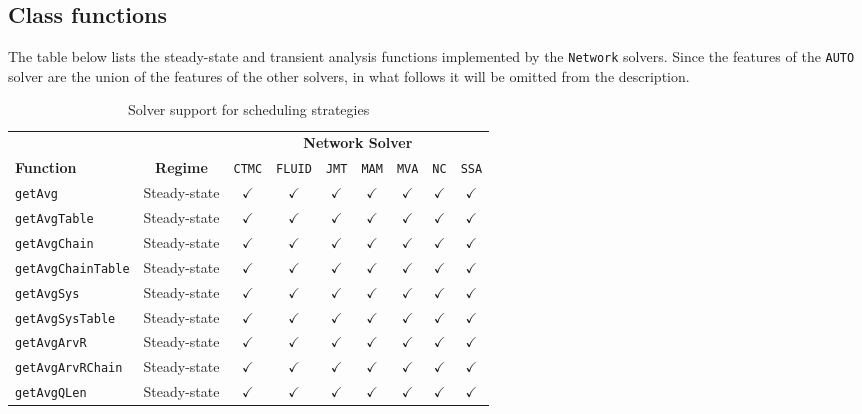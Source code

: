 \subsection{Class functions}
The table below lists the steady-state and transient analysis functions implemented by the \texttt{Network} solvers. Since the features of the \texttt{AUTO} solver are the union of the features of the other solvers, in what follows it will be omitted from the description.
{\scriptsize
\begin{table}[thbp]
\renewcommand{\arraystretch}{1.2}
\centering
\caption{Solver support for scheduling strategies}
\begin{tabular}{|l|c|c|c|c|c|c|c|c|}
\cline{3-9}
\multicolumn{1}{l}{}& &\multicolumn{7}{c|}{\textbf{Network Solver}}\\
\cline{1-9}
\textbf{Function}& \textbf{Regime}&\texttt{CTMC}&\texttt{FLUID} 	&\texttt{JMT} 	&\texttt{MAM}	&\texttt{MVA}	&\texttt{NC} &\texttt{SSA}	\\
\hline
\texttt{getAvg}	& Steady-state &$\checkmark$			&$\checkmark$	&  $\checkmark$	 	&  $\checkmark$	 & $\checkmark$	&  $\checkmark$		& $\checkmark$	\\
\texttt{getAvgTable} & Steady-state 	&$\checkmark$			&$\checkmark$	&  $\checkmark$	 	&  $\checkmark$	 & $\checkmark$	&  $\checkmark$		& $\checkmark$	\\
\texttt{getAvgChain} & Steady-state 	&$\checkmark$			&$\checkmark$	&  $\checkmark$	 	&  $\checkmark$	 & $\checkmark$	&  $\checkmark$		& $\checkmark$	\\
\texttt{getAvgChainTable} & Steady-state  &$\checkmark$			&$\checkmark$	&  $\checkmark$	 	&  $\checkmark$	 & $\checkmark$	&  $\checkmark$		& $\checkmark$	\\	
\texttt{getAvgSys} & Steady-state  &$\checkmark$			&$\checkmark$	&  $\checkmark$	 	&  $\checkmark$	 & $\checkmark$	&  $\checkmark$		& $\checkmark$	\\
\texttt{getAvgSysTable} & Steady-state  &$\checkmark$			&$\checkmark$	&  $\checkmark$	 	&  $\checkmark$	 & $\checkmark$	&  $\checkmark$		& $\checkmark$	\\	
\hline
\texttt{getAvgArvR}	& Steady-state &$\checkmark$			&$\checkmark$	&  $\checkmark$	 	&  $\checkmark$	 & $\checkmark$	&  $\checkmark$		& $\checkmark$	\\
\texttt{getAvgArvRChain}	& Steady-state &$\checkmark$			&$\checkmark$	&  $\checkmark$	 	&  $\checkmark$	 & $\checkmark$	&  $\checkmark$		& $\checkmark$	\\
\texttt{getAvgQLen}	& Steady-state &$\checkmark$			&$\checkmark$	&  $\checkmark$	 	&  $\checkmark$	 & $\checkmark$	&  $\checkmark$		& $\checkmark$	\\

\end{tabular}
\end{table}}
